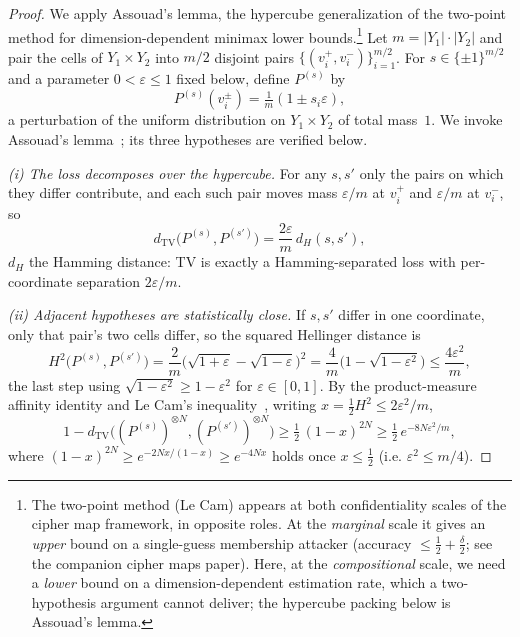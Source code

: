 \documentclass[11pt]{article}
\theoremstyle{definition}
\theoremstyle{plain}
\theoremstyle{remark}
\newcommand{\TV}{d_{\mathrm{TV}}}
\begin{document}
\begin{proof}
We apply Assouad's lemma, the hypercube generalization of the
two-point method for dimension-dependent minimax lower
bounds.\footnote{The
two-point method (Le Cam) appears at both confidentiality scales of
the cipher map framework, in opposite roles. At the \emph{marginal}
scale it gives an \emph{upper} bound on a single-guess membership
attacker (accuracy $\leq \tfrac12 + \tfrac\delta2$; see the companion
cipher maps paper). Here, at the \emph{compositional} scale, we need a
\emph{lower} bound on a dimension-dependent estimation rate, which a
two-hypothesis argument cannot deliver; the hypercube packing below is
Assouad's lemma.}  Let $m = |Y_1| \cdot |Y_2|$ and pair the cells of
$Y_1 \times Y_2$ into $m/2$ disjoint pairs
$\{(v_i^+, v_i^-)\}_{i=1}^{m/2}$.  For $s \in \{\pm 1\}^{m/2}$ and a
parameter $0 < \varepsilon \leq 1$ fixed below, define $P^{(s)}$ by
\[
P^{(s)}(v_i^{\pm}) = \tfrac{1}{m}(1 \pm s_i \varepsilon),
\]
a perturbation of the uniform distribution on $Y_1 \times Y_2$ of total
mass~$1$.  We invoke Assouad's
lemma~\cite[Thm.~2.12]{tsybakov2009nonparametric}; its three
hypotheses are verified below.

\emph{(i) The loss decomposes over the hypercube.}  For any
$s, s'$ only the pairs on which they differ contribute, and each such
pair moves mass $\varepsilon/m$ at $v_i^+$ and $\varepsilon/m$ at
$v_i^-$, so
\[
\TV\bigl(P^{(s)}, P^{(s')}\bigr)
  = \frac{2\varepsilon}{m}\, d_H(s, s'),
\]
$d_H$ the Hamming distance: TV is exactly a Hamming-separated loss with
per-coordinate separation $2\varepsilon/m$.

\emph{(ii) Adjacent hypotheses are statistically close.}  If $s, s'$
differ in one coordinate, only that pair's two cells differ, so the
squared Hellinger distance is
\[
H^2\bigl(P^{(s)}, P^{(s')}\bigr)
  = \frac{2}{m}\bigl(\sqrt{1+\varepsilon} - \sqrt{1-\varepsilon}\bigr)^2
  = \frac{4}{m}\bigl(1 - \sqrt{1-\varepsilon^2}\bigr)
  \leq \frac{4\varepsilon^2}{m},
\]
the last step using $\sqrt{1-\varepsilon^2} \geq 1 - \varepsilon^2$ for
$\varepsilon \in [0,1]$.  By the product-measure affinity identity and
Le Cam's inequality~\cite[\S2.4]{tsybakov2009nonparametric}, writing
$x = \tfrac12 H^2 \leq 2\varepsilon^2/m$,
\[
1 - \TV\bigl((P^{(s)})^{\otimes N}, (P^{(s')})^{\otimes N}\bigr)
  \geq \tfrac12\,(1 - x)^{2N}
  \geq \tfrac12\, e^{-8 N \varepsilon^2 / m},
\]
where $(1-x)^{2N} \geq e^{-2Nx/(1-x)} \geq e^{-4Nx}$ holds once
$x \leq \tfrac12$ (i.e. $\varepsilon^2 \leq m/4$).


\end{proof}
\end{document}
